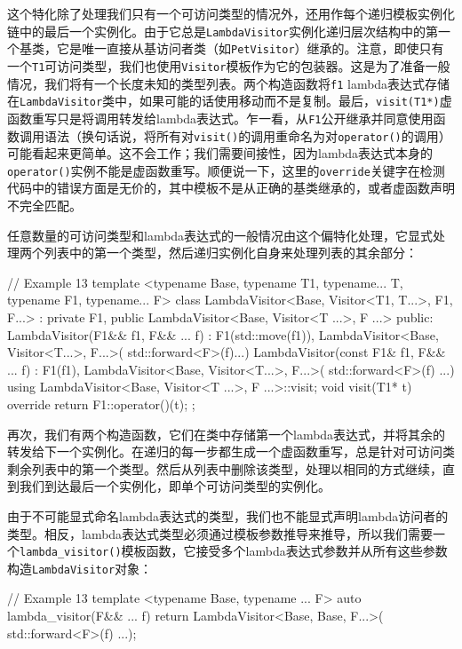 \begin{code}
{这个特化除了处理我们只有一个可访问类型的情况外，还用作每个递归模板实例化链中的最后一个实例化。由于它总是\texttt{LambdaVisitor}实例化递归层次结构中的第一个基类，它是唯一直接从基访问者类（如\texttt{PetVisitor}）继承的。注意，即使只有一个\texttt{T1}可访问类型，我们也使用\texttt{Visitor}模板作为它的包装器。这是为了准备一般情况，我们将有一个长度未知的类型列表。两个构造函数将\texttt{f1} lambda表达式存储在\texttt{LambdaVisitor}类中，如果可能的话使用移动而不是复制。最后，\texttt{visit(T1*)}虚函数重写只是将调用转发给lambda表达式。乍一看，从\texttt{F1}公开继承并同意使用函数调用语法（换句话说，将所有对\texttt{visit()}的调用重命名为对\texttt{operator()}的调用）可能看起来更简单。这不会工作；我们需要间接性，因为lambda表达式本身的\texttt{operator()}实例不能是虚函数重写。顺便说一下，这里的\texttt{override}关键字在检测代码中的错误方面是无价的，其中模板不是从正确的基类继承的，或者虚函数声明不完全匹配。

任意数量的可访问类型和lambda表达式的一般情况由这个偏特化处理，它显式处理两个列表中的第一个类型，然后递归实例化自身来处理列表的其余部分：

\begin{code}
// Example 13
template <typename Base,
          typename T1, typename... T,
          typename F1, typename... F>
class LambdaVisitor<Base, Visitor<T1, T...>, F1, F...> :
  private F1,
  public LambdaVisitor<Base, Visitor<T ...>, F ...>
{
  public:
  LambdaVisitor(F1&& f1, F&& ... f) :
    F1(std::move(f1)),
    LambdaVisitor<Base, Visitor<T...>, F...>(
      std::forward<F>(f)...)
  {}
  LambdaVisitor(const F1& f1, F&& ... f) :
    F1(f1),
    LambdaVisitor<Base, Visitor<T...>, F...>(
      std::forward<F>(f) ...)
  {}
  using LambdaVisitor<Base, Visitor<T ...>, F ...>::visit;
  void visit(T1* t) override { return F1::operator()(t); }
};
\end{code}

再次，我们有两个构造函数，它们在类中存储第一个lambda表达式，并将其余的转发给下一个实例化。在递归的每一步都生成一个虚函数重写，总是针对可访问类剩余列表中的第一个类型。然后从列表中删除该类型，处理以相同的方式继续，直到我们到达最后一个实例化，即单个可访问类型的实例化。

由于不可能显式命名lambda表达式的类型，我们也不能显式声明lambda访问者的类型。相反，lambda表达式类型必须通过模板参数推导来推导，所以我们需要一个\texttt{lambda\_visitor()}模板函数，它接受多个lambda表达式参数并从所有这些参数构造\texttt{LambdaVisitor}对象：

\begin{code}
// Example 13
template <typename Base, typename ... F>
auto lambda_visitor(F&& ... f) {
  return LambdaVisitor<Base, Base, F...>(
    std::forward<F>(f) ...);
}
\end{code}

}
\end{code}

